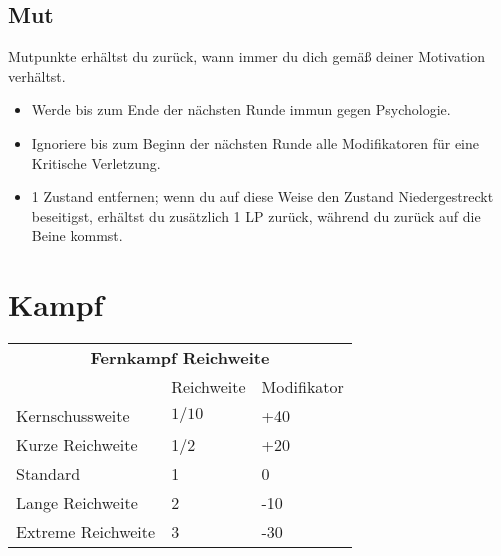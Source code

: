 \documentclass[a4paper, fontsize=10pt twocolumn]{scrartcl}
\begin{document}
\begin{multicols}{2}
    \subsection{Mut}
    Mutpunkte erhältst du zurück, wann immer du dich gemäß deiner Motivation verhältst.
    \begin{itemize}
        \item Werde bis zum Ende der nächsten Runde immun gegen Psychologie.
        \item Ignoriere bis zum Beginn der nächsten Runde alle Modifikatoren für eine Kritische Verletzung.
        \item 1 Zustand entfernen; wenn du auf diese Weise den Zustand Niedergestreckt beseitigst, erhältst du zusätzlich 1 LP zurück, während du zurück auf die Beine kommst.
    \end{itemize}

\end{multicols}

\section{Kampf}
\begin{table}[!ht]
    \centering
    \begin{tabularx}{\textwidth}{l|l|l}
        \multicolumn{3}{c}{\cellcolor{gray!25} \textbf{Fernkampf Reichweite}} \\ \cline{1-3}
                           & Reichweite & Modifikator                         \\ \cline{1-3}
        Kernschussweite    & $1/10$     & +40                                 \\
        Kurze Reichweite   & 1/2        & +20                                 \\
        Standard           & 1          & 0                                   \\
        Lange Reichweite   & 2          & -10                                 \\
        Extreme Reichweite & 3          & -30
    \end{tabularx}
\end{table}
\end{document}
